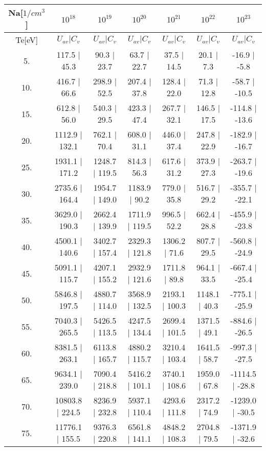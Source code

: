 \begin{tabular}{|c||c|c|c|c|c|c|}
\hline
Na[$1/cm^3$] & $10^{18}$ & $10^{19}$ & $10^{20}$ & $10^{21}$ & $10^{22}$ & $10^{23}$\tabularnewline
\hline
Te[eV] & $U_{av} | C_v$ & $U_{av} | C_v$ & $U_{av} | C_v$ & $U_{av} | C_v$ & $U_{av} | C_v$ & $U_{av} | C_v$\tabularnewline
\hline
\hline
   5. &    117.5 |    45.3 &     90.3 |    23.7 &     63.7 |    22.7 &     37.5 |    14.5 &     20.1 |     7.3 &    -16.9 |    -5.8\tabularnewline
\hline
  10. &    416.7 |    66.6 &    298.9 |    52.5 &    207.4 |    37.8 &    128.4 |    22.0 &     71.3 |    12.8 &    -58.7 |   -10.5\tabularnewline
\hline
  15. &    612.8 |    56.0 &    540.3 |    29.5 &    423.3 |    47.4 &    267.7 |    32.1 &    146.5 |    17.5 &   -114.8 |   -13.6\tabularnewline
\hline
  20. &   1112.9 |   132.1 &    762.1 |    70.4 &    608.0 |    31.1 &    446.0 |    37.4 &    247.8 |    22.9 &   -182.9 |   -16.7\tabularnewline
\hline
  25. &   1931.1 |   171.2 &   1248.7 |   119.5 &    814.3 |    56.3 &    617.6 |    31.2 &    373.9 |    27.3 &   -263.7 |   -19.6\tabularnewline
\hline
  30. &   2735.6 |   164.4 &   1954.7 |   149.0 &   1183.9 |    90.2 &    779.0 |    35.8 &    516.7 |    29.2 &   -355.7 |   -22.1\tabularnewline
\hline
  35. &   3629.0 |   190.3 &   2662.4 |   139.9 &   1711.9 |   119.5 &    996.5 |    52.2 &    662.4 |    28.8 &   -455.9 |   -23.8\tabularnewline
\hline
  40. &   4500.1 |   140.6 &   3402.7 |   157.4 &   2329.3 |   121.8 &   1306.2 |    71.6 &    807.7 |    29.5 &   -560.8 |   -24.9\tabularnewline
\hline
  45. &   5091.1 |   115.7 &   4207.1 |   155.2 &   2932.9 |   121.6 &   1711.8 |    89.8 &    964.1 |    33.5 &   -667.4 |   -25.4\tabularnewline
\hline
  50. &   5846.8 |   197.5 &   4880.7 |   114.0 &   3568.9 |   132.5 &   2193.1 |   100.3 &   1148.1 |    40.3 &   -775.1 |   -25.9\tabularnewline
\hline
  55. &   7040.3 |   265.5 &   5426.5 |   113.5 &   4247.5 |   134.4 &   2699.4 |   101.5 &   1371.5 |    49.1 &   -884.6 |   -26.5\tabularnewline
\hline
  60. &   8381.5 |   263.1 &   6113.8 |   165.7 &   4880.2 |   115.7 &   3210.4 |   103.4 &   1641.5 |    58.7 &   -997.3 |   -27.5\tabularnewline
\hline
  65. &   9634.1 |   239.0 &   7090.4 |   218.8 &   5416.2 |   101.1 &   3740.1 |   108.6 &   1959.0 |    67.8 &  -1114.5 |   -28.8\tabularnewline
\hline
  70. &  10803.8 |   224.5 &   8236.9 |   232.8 &   5937.1 |   110.4 &   4293.6 |   111.8 &   2317.2 |    74.9 &  -1239.0 |   -30.5\tabularnewline
\hline
  75. &  11776.1 |   155.5 &   9376.3 |   220.8 &   6561.8 |   141.1 &   4848.2 |   108.3 &   2704.8 |    79.5 &  -1371.9 |   -32.6\tabularnewline

\end{tabular}
